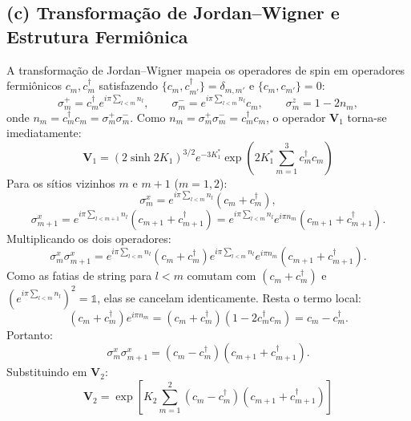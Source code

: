 \documentclass[11pt,a4paper]{article}
\begin{document}
\subsection*{(c) Transformação de Jordan--Wigner e Estrutura Fermiônica}
%
A transformação de Jordan--Wigner mapeia os operadores de spin em operadores fermiônicos $c_m, c_m^\dagger$ satisfazendo $\{c_m, c_{m'}^\dagger\} = \delta_{m,m'}$ e $\{c_m, c_{m'}\} = 0$:
%
\begin{equation}
    \sigma_m^+ = c_m^\dagger e^{i\pi \sum_{l<m} n_l}, \qquad \sigma_m^- = e^{i\pi \sum_{l<m} n_l} c_m, \qquad \sigma_m^z = 1 - 2n_m,
\end{equation}
%
onde $n_m = c_m^\dagger c_m = \sigma_m^+ \sigma_m^-$. Como $n_m = \sigma_m^+ \sigma_m^- = c_m^\dagger c_m$, o operador $\mathbf{V}_1$ torna-se imediatamente:
%
\begin{equation}
    \boxed{\mathbf{V}_1 = (2\sinh 2K_1)^{3/2} e^{-3K_1^*} \exp\left( 2K_1^* \sum_{m=1}^{3} c_m^\dagger c_m \right)}
\end{equation}
%
Para os sítios vizinhos $m$ e $m+1$ ($m=1,2$):
%
\begin{equation}
    \sigma_m^x = e^{i\pi \sum_{l<m} n_l} (c_m + c_m^\dagger),
\end{equation}
%
\begin{equation}
    \sigma_{m+1}^x = e^{i\pi \sum_{l<m+1} n_l} (c_{m+1} + c_{m+1}^\dagger) = e^{i\pi \sum_{l<m} n_l} e^{i\pi n_m} (c_{m+1} + c_{m+1}^\dagger).
\end{equation}
%
Multiplicando os dois operadores:
%
\begin{equation}
    \sigma_m^x \sigma_{m+1}^x = e^{i\pi \sum_{l<m} n_l} (c_m + c_m^\dagger) e^{i\pi \sum_{l<m} n_l} e^{i\pi n_m} (c_{m+1} + c_{m+1}^\dagger).
\end{equation}
%
Como as fatias de string para $l < m$ comutam com $(c_m + c_m^\dagger)$ e $(e^{i\pi \sum_{l<m} n_l})^2 = \mathbb{1}$, elas se cancelam identicamente. Resta o termo local:
%
\begin{equation}
    (c_m + c_m^\dagger) e^{i\pi n_m} = (c_m + c_m^\dagger) (1 - 2c_m^\dagger c_m) = c_m - c_m^\dagger.
\end{equation}
%
Portanto:
%
\begin{equation}
    \sigma_m^x \sigma_{m+1}^x = (c_m - c_m^\dagger)(c_{m+1} + c_{m+1}^\dagger).
\end{equation}
%
Substituindo em $\mathbf{V}_2$:
%
\begin{equation}
    \boxed{\mathbf{V}_2 = \exp\left[ K_2 \sum_{m=1}^{2} (c_m - c_m^\dagger)(c_{m+1} + c_{m+1}^\dagger) \right]}
\end{equation}
\end{document}
